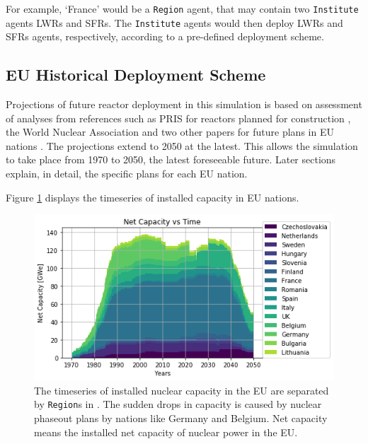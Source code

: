 For example, `France' would be a \texttt{Region} agent,
that may contain two \texttt{Institute} agents \glspl{LWR}
and \glspl{SFR}. The \texttt{Institute} agents would then deploy
\glspl{LWR} and \glspl{SFR} agents, respectively, according to a pre-defined deployment
scheme.


\subsection{\gls{EU} Historical Deployment Scheme}
Projections of future reactor deployment in this simulation is based on assessment of analyses
from references such as \gls{PRIS} for reactors planned for construction \cite{iaea_nuclear_2017},
the World Nuclear Association and two other papers for future plans in EU nations
\cite{world_nuclear_association_nuclear_2017, joskow_future_2012, hatch_politics_2015}.
The projections extend to 2050 at the latest. This allows the simulation to take place from
1970 to 2050, the latest foreseeable future. Later sections explain, in detail, the specific plans for each \gls{EU} nation.

Figure \ref{fig:eu_pow} displays the
timeseries of installed capacity in \gls{EU} nations.

\begin{figure}[htbp!]
	\begin{center}
		\includegraphics[scale=0.7]{./images/eu_future/power_plot.png}
	\end{center}
	\caption{The timeseries of installed nuclear capacity in the EU are separated by \texttt{Region}s in \Cyclus.
			 The sudden drops in capacity is caused by nuclear phaseout plans by nations like Germany and Belgium.
			 Net capacity means the installed net capacity of nuclear power in the \gls{EU}.}
	\label{fig:eu_pow}
\end{figure}
\FloatBarrier

